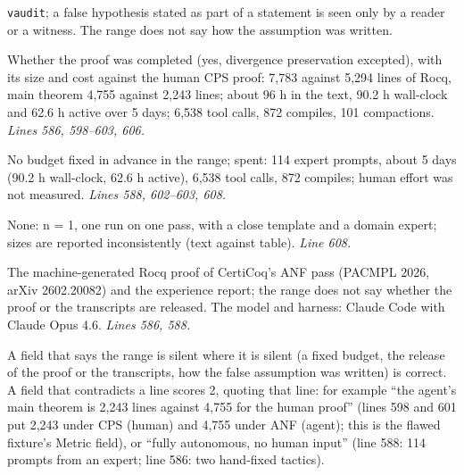 \documentclass[11pt]{article}
\begin{document}
\begin{description}
  \texttt{vaudit}; a false hypothesis stated as part of a statement is seen
  only by a reader or a witness. The range does not say how the assumption
  was written.
\item[Metric.] Whether the proof was completed (yes, divergence preservation
  excepted), with its size and cost against the human CPS proof: 7,783 against
  5,294 lines of Rocq, main theorem 4,755 against 2,243 lines; about 96 h in
  the text, 90.2 h wall-clock and 62.6 h active over 5 days; 6,538 tool calls,
  872 compiles, 101 compactions. \emph{Lines 586, 598--603, 606.}
\item[Budget.] No budget fixed in advance in the range; spent: 114 expert
  prompts, about 5 days (90.2 h wall-clock, 62.6 h active), 6,538 tool calls,
  872 compiles; human effort was not measured. \emph{Lines 588, 602--603,
  608.}
\item[Variance.] None: n = 1, one run on one pass, with a close template and a
  domain expert; sizes are reported inconsistently (text against table).
  \emph{Line 608.}
\item[Artifact.] The machine-generated Rocq proof of CertiCoq's ANF pass
  (PACMPL 2026, arXiv 2602.20082) and the experience report; the range does
  not say whether the proof or the transcripts are released. The model and
  harness: Claude Code with Claude Opus 4.6. \emph{Lines 586, 588.}
\end{description}
A field that says the range is silent where it is silent (a fixed budget,
the release of the proof or the transcripts, how the false assumption was
written) is correct. A field that contradicts a line scores 2, quoting that
line: for example ``the agent's main theorem is 2,243 lines against 4,755 for
the human proof'' (lines 598 and 601 put 2,243 under CPS (human) and 4,755
under ANF (agent); this is the flawed fixture's Metric field), or ``fully
autonomous, no human input'' (line 588: 114 prompts from an expert; line 586:
two hand-fixed tactics).
\end{document}
